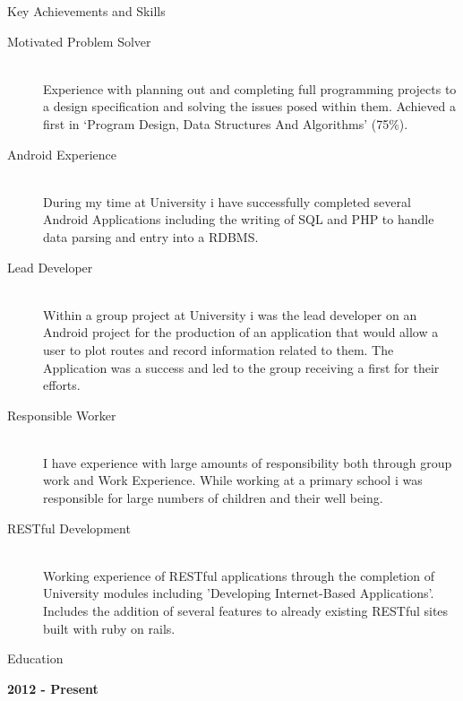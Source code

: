 \documentclass[10pt,a4paper]{article}
\begin{document}
\Large
\noindent
Key Achievements and Skills\\
\normalsize
\begin{description}
  \item[Motivated Problem Solver] \hfill \\ Experience with planning out and completing full programming projects to a design specification and solving the issues posed within them. Achieved a first in ‘Program Design, Data Structures And Algorithms’ (75\%).
  \item[Android Experience]\hfill \\ During my time at University i have successfully completed several Android Applications including the writing of SQL and PHP to handle data parsing and entry into a RDBMS.
  \item[Lead Developer]\hfill \\ Within a group project at University  i was the lead developer on an Android project for the production of an application that would allow a user to plot routes and record information related to them. The Application was a success and led to the group receiving a first for their efforts. 
   \item[Responsible Worker ]\hfill \\ I have experience with large amounts of responsibility both through group work and Work Experience. While working at a primary school i was responsible for large numbers of children and their well being. 
    \item[RESTful Development]\hfill \\ Working experience of RESTful applications through the completion of University modules including 'Developing Internet-Based Applications'. Includes the addition of several features to already existing RESTful sites built with ruby on rails.\\
\end{description}


\Large
\noindent
Education\\
\large
\vspace{0.1cm}
\noindent

\textbf{2012 - Present }\\
\normalsize
\end{document}
